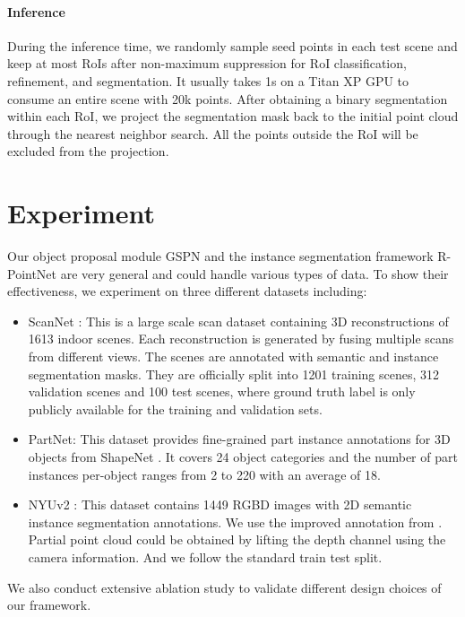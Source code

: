 \documentclass[10pt,twocolumn,letterpaper]{article}
\begin{document}
\vspace{-\baselineskip}
\paragraph{Inference}
During the inference time, we randomly sample  seed points in each test scene and keep at most  RoIs after non-maximum suppression for RoI classification, refinement, and segmentation. It usually takes 1s on a Titan XP GPU to consume an entire scene with 20k points. After obtaining a binary segmentation within each RoI, we project the segmentation mask back to the initial point cloud through the nearest neighbor search. All the points outside the RoI will be excluded from the projection. 
 
\section{Experiment}
Our object proposal module GSPN and the instance segmentation framework R-PointNet are very general and could handle various types of data. To show their effectiveness, we experiment on three different datasets including:
\begin{itemize}
\setlength\itemsep{-0.2em}
    \item ScanNet \cite{dai2017scannet}: This is a large scale scan dataset containing 3D reconstructions of 1613 indoor scenes. Each reconstruction is generated by fusing multiple scans from different views. The scenes are annotated with semantic and instance segmentation masks. They are officially split into 1201 training scenes, 312 validation scenes and 100 test scenes, where ground truth label is only publicly available for the training and validation sets. 
    \item PartNet\cite{mo2018partnet}: This dataset provides fine-grained part instance annotations for 3D objects from ShapeNet \cite{chang2015shapenet}. It covers 24 object categories and the number of part instances per-object ranges from 2 to 220 with an average of 18.
    \item NYUv2 \cite{Silberman:ECCV12}: This dataset contains 1449 RGBD images with 2D semantic instance segmentation annotations. We use the improved annotation from \cite{deng2017amodal}. Partial point cloud could be obtained by lifting the depth channel using the camera information. And we follow the standard train test split.
\end{itemize}
\noindent
We also conduct extensive ablation study to validate different design choices of our framework.
\end{document}
